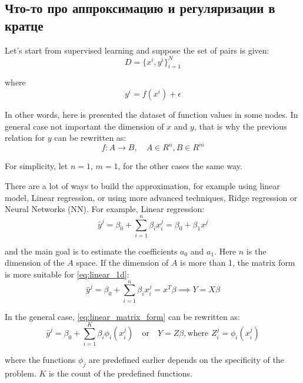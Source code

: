 \subsection{Что-то про аппроксимацию и регуляризации в кратце}

Let's start from supervised learning and suppose the set of pairs is given:
\begin{equation*}
	D = \{ x^i, y^i \}_{i = 1}^N
\end{equation*}

where 
\begin{equation*}
y^i = f(x^i) + \epsilon
\end{equation*}

In other words, here is presented the dataset of function values in some nodes. In general case not important the dimension of $x$ and $y$, that is why the previous relation for $y$ can be rewritten as:
\begin{equation*}
	f: A \rightarrow B, \quad A \in R^n, B \in R^m
\end{equation*}

For simplicity, let $n = 1$, $m = 1$, for the other cases the same way.

There are a lot of ways to build the approximation, for example using linear model, Linear regression, or using more advanced techniques, Ridge regression or Neural Networks (NN). For example, Linear regression:
\begin{equation}
	\label{eq:linear_1d}
	\hat{y}^j = \beta_0 + \sum_{i = 1}^n \beta_i x^j_i = \beta_0 + \beta_1 x^j
\end{equation}

and the main goal is to estimate the coefficients $a_0$ and $a_1$. Here $n$ is the dimension of the $A$ space. If the dimension of $A$ is more than 1, the matrix form  is more suitable for \eqref{eq:linear_1d}:
\begin{equation}
	\label{eq:linear_matrix_form}
	\hat{y}^j = \beta_0 + \sum_{i = 1}^n \beta_i x^j_i = x^T \beta \implies Y = X \beta
\end{equation}


In the general case, \eqref{eq:linear_matrix_form} can be rewritten as:
\begin{equation}
	\label{eq:linear_expansion}
	\hat{y}^j = \beta_0 + \sum_{i = 1}^K \beta_i \phi_i(x^j_i) \quad \text{or} \quad Y = Z \beta, \text{where } Z^j_i = \phi_i(x^j_i)
\end{equation}

where the functions $\phi_j$ are predefined earlier depends on the specificity of the problem. $K$ is the count of the predefined functions.

